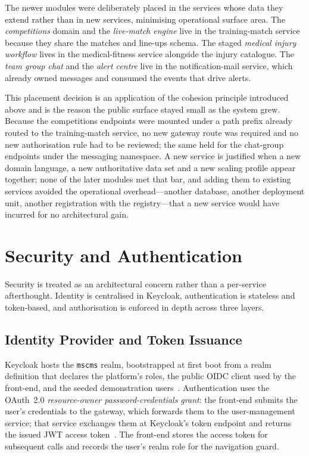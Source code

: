 The newer modules were deliberately placed in the services whose data they extend
rather than in new services, minimising operational surface area. The
\emph{competitions} domain and the \emph{live-match engine} live in the training-match
service because they share the matches and line-ups schema. The staged
\emph{medical injury workflow} lives in the medical-fitness service alongside the
injury catalogue. The \emph{team group chat} and the \emph{alert centre} live in the
notification-mail service, which already owned messages and consumed the events that
drive alerts.

This placement decision is an application of the cohesion principle introduced above
and is the reason the public surface stayed small as the system grew. Because the
competitions endpoints were mounted under a path prefix already routed to the
training-match service, no new gateway route was required and no new authorisation
rule had to be reviewed; the same held for the chat-group endpoints under the
messaging namespace. A new service is justified when a new domain language, a new
authoritative data set and a new scaling profile appear together; none of the later
modules met that bar, and adding them to existing services avoided the operational
overhead---another database, another deployment unit, another registration with the
registry---that a new service would have incurred for no architectural gain.

\section{Security and Authentication}
\label{sec:security}

Security is treated as an architectural concern rather than a per-service afterthought.
Identity is centralised in Keycloak, authentication is stateless and token-based, and
authorisation is enforced in depth across three layers.

\subsection{Identity Provider and Token Issuance}

Keycloak hosts the \texttt{mscms} realm, bootstrapped at first boot from a realm
definition that declares the platform's roles, the public OIDC client used by the
front-end, and the seeded demonstration users~\cite{keycloak}. Authentication uses the
OAuth~2.0 \emph{resource-owner password-credentials grant}: the front-end submits the
user's credentials to the gateway, which forwards them to the user-management service;
that service exchanges them at Keycloak's token endpoint and returns the issued JWT
access token~\cite{jwt}. The front-end stores the access token for subsequent calls
and records the user's realm role for the navigation guard.

